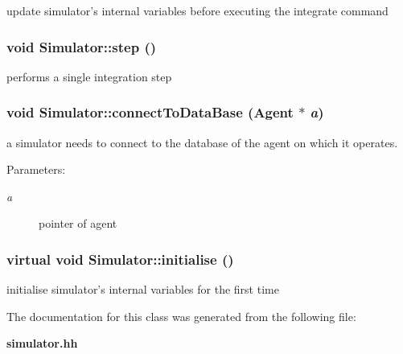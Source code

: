 update simulator's internal variables before executing the integrate command 
\subsubsection[step]{\setlength{\rightskip}{0pt plus 5cm}void Simulator::step ()\hspace{0.3cm}{\tt  [protected]}}\label{classSimulator_c11a8e1119c88c075853f11a23518d0d}


performs a single integration step 
\subsubsection[connectToDataBase]{\setlength{\rightskip}{0pt plus 5cm}void Simulator::connectToDataBase ({\bf Agent} $\ast$ {\em a})\hspace{0.3cm}{\tt  [protected]}}\label{classSimulator_d350191a67743facc3ae5371a5a42bcb}


a simulator needs to connect to the database of the agent on which it operates. \begin{Desc}
\item[Parameters:]
\begin{description}
\item[{\em a}]pointer of agent \end{description}
\end{Desc}
\subsubsection[initialise]{\setlength{\rightskip}{0pt plus 5cm}virtual void Simulator::initialise ()\hspace{0.3cm}{\tt  [protected, pure virtual]}}\label{classSimulator_c0d11612f02bb161aefd08905ca5809f}


initialise simulator's internal variables for the first time 

The documentation for this class was generated from the following file:\begin{CompactItemize}
\item 
{\bf simulator.hh}\end{CompactItemize}
